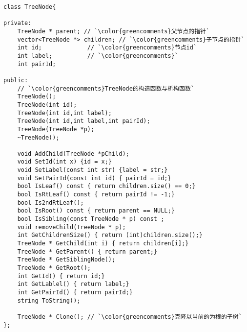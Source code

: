 \documentclass[border=6mm]{standalone}
\begin{document}
\begin{CJK}{UTF8}{gbsn}
\begin{lstlisting}
class TreeNode{
    
private:
    TreeNode * parent; // `\color{greencomments}父节点的指针`
    vector<TreeNode *> children; // `\color{greencomments}子节点的指针`
    int id;             // `\color{greencomments}节点id`
    int label;          // `\color{greencomments}`
    int pairId;
    
public:
    // `\color{greencomments}TreeNode的构造函数与析构函数`
    TreeNode();
    TreeNode(int id);
    TreeNode(int id,int label);
    TreeNode(int id,int label,int pairId);
    TreeNode(TreeNode *p);
    ~TreeNode();
    
    void AddChild(TreeNode *pChild);
    void SetId(int x) {id = x;}
    void SetLabel(const int str) {label = str;}
    void SetPairId(const int id) { pairId = id;}
    bool IsLeaf() const { return children.size() == 0;}
    bool IsRtLeaf() const { return pairId != -1;}
    bool Is2ndRtLeaf();
    bool IsRoot() const { return parent == NULL;}
    bool IsSibling(const TreeNode * p) const ;
    void removeChild(TreeNode * p);
    int GetChildrenSize() { return (int)children.size();}
    TreeNode * GetChild(int i) { return children[i];}
    TreeNode * GetParent() { return parent;}
    TreeNode * GetSiblingNode();
    TreeNode * GetRoot();
    int GetId() { return id;}
    int GetLablel() { return label;}
    int GetPairId() { return pairId;}
    string ToString();
    
    TreeNode * Clone(); // `\color{greencomments}克隆以当前的为根的子树`
};
\end{lstlisting}
\end{CJK}
\end{document}
